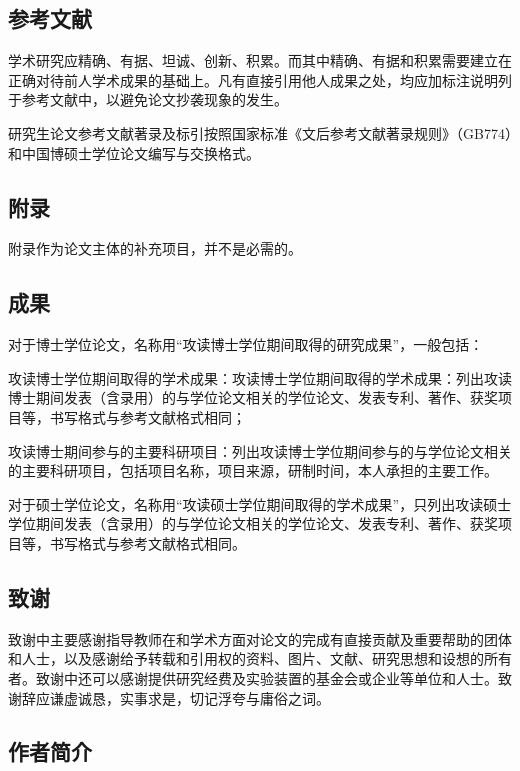 \subsection{参考文献}

学术研究应精确、有据、坦诚、创新、积累。而其中精确、有据和积累需要建立在正确对待前人学术成果的基础上。凡有直接引用他人成果之处，均应加标注说明列于参考文献中，以避免论文抄袭现象的发生。

研究生论文参考文献著录及标引按照国家标准《文后参考文献著录规则》（GB774）和中国博硕士学位论文编写与交换格式。

\subsection{附录}

附录作为论文主体的补充项目，并不是必需的。

\subsection{成果}

对于博士学位论文，名称用“攻读博士学位期间取得的研究成果”，一般包括：

攻读博士学位期间取得的学术成果：攻读博士学位期间取得的学术成果：列出攻读博士期间发表（含录用）的与学位论文相关的学位论文、发表专利、著作、获奖项目等，书写格式与参考文献格式相同；

攻读博士期间参与的主要科研项目：列出攻读博士学位期间参与的与学位论文相关的主要科研项目，包括项目名称，项目来源，研制时间，本人承担的主要工作。

对于硕士学位论文，名称用“攻读硕士学位期间取得的学术成果”，只列出攻读硕士学位期间发表（含录用）的与学位论文相关的学位论文、发表专利、著作、获奖项目等，书写格式与参考文献格式相同。

\subsection{致谢}
致谢中主要感谢指导教师在和学术方面对论文的完成有直接贡献及重要帮助的团体和人士，以及感谢给予转载和引用权的资料、图片、文献、研究思想和设想的所有者。致谢中还可以感谢提供研究经费及实验装置的基金会或企业等单位和人士。致谢辞应谦虚诚恳，实事求是，切记浮夸与庸俗之词。

\subsection{作者简介}

